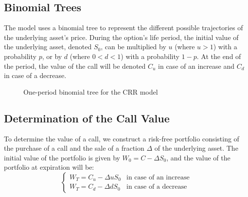 \documentclass[a4paper,10pt]{article}
\begin{document}
    \subsection*{Binomial Trees}
    
        \noindent The model uses a binomial tree to represent the different possible trajectories of the underlying asset's price. During the option's life period, the initial value of the underlying asset, denoted \( S_0 \), can be multiplied by \( u \) (where \( u > 1 \)) with a probability \( p \), or by \( d \) (where \( 0 < d < 1 \)) with a probability \( 1 - p \). At the end of the period, the value of the call will be denoted \( C_u \) in case of an increase and \( C_d \) in case of a decrease.
        
        \begin{figure}[ht]
        \centering
        \caption{One-period binomial tree for the CRR model}
        \end{figure}
        
    \subsection*{Determination of the Call Value}
    
        \noindent To determine the value of a call, we construct a risk-free portfolio consisting of the purchase of a call and the sale of a fraction \( \Delta \) of the underlying asset. The initial value of the portfolio is given by \( W_0 = C - \Delta S_0 \), and the value of the portfolio at expiration will be:
        \\\[ 
        \begin{cases} 
        W_T = C_u - \Delta u S_0 & \text{in case of an increase} \\
        W_T = C_d - \Delta d S_0 & \text{in case of a decrease}
        \end{cases} 
        \]\\
        
\end{document}
